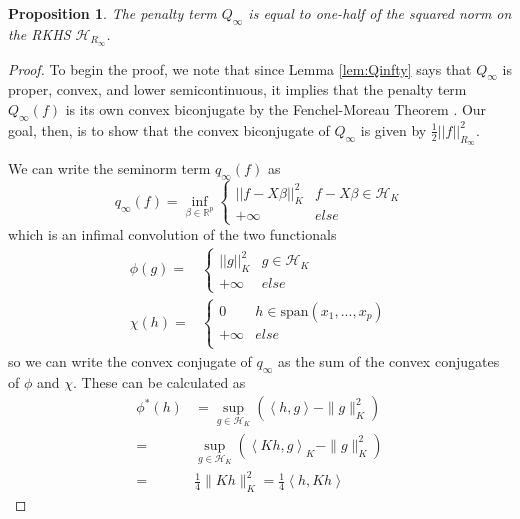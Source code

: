 \documentclass[ejsv2,preprint]{imsart}
\newtheorem{prop}{Proposition}[section]
\newcommand{\inprod}[2]{\left\langle #1,#2\right\rangle}
\newcommand{\norm}[1]{\left|\left|  #1 \right| \right|}
\newcommand{\SPAN}[1]{\text{span}\left(#1\right)}
\begin{document}
\begin{prop}
    The penalty term $Q_\infty$ is equal to one-half of the squared norm on the RKHS $\mathcal{H}_{R_\infty}$.
\end{prop}
\begin{proof}
To begin the proof, we note that since Lemma \ref{lem:Qinfty} says that $Q_\infty$ is proper, convex, and lower semicontinuous, it implies that the penalty term $Q_\infty(f)$ is its own convex biconjugate by the Fenchel-Moreau Theorem \cite{correa2023fundamentals}. Our goal, then, is to show that the convex biconjugate of $Q_\infty$ is given by $\frac{1}{2}\norm{f}^2_{R_\infty}$.

We can write the seminorm term $q_\infty(f)$ as
\begin{equation}
    q_\infty(f)=\underset{\beta\in \mathbb{R}^p}{\inf}\begin{cases}
        \norm{f-X\beta}_K^2&f-X\beta\in \mathcal{H}_K\\
        +\infty&else
    \end{cases}
\end{equation}
which is an infimal convolution of the two functionals
\begin{equation}
    \begin{split}
        \phi(g) =&\begin{cases}
        \norm{g}_K^2&g\in \mathcal{H}_K\\
        +\infty&else
    \end{cases} \\
    \chi(h) =& \begin{cases}0&h\in \SPAN{x_1,...,x_p}\\
    +\infty & else \\ \end{cases}
    \end{split}
\end{equation}
so we can write the convex conjugate of $q_\infty$ as the sum of the convex conjugates of $\phi$ and $\chi$. These can be calculated as 
\begin{equation}
    \begin{split}
        \phi^*(h) & = \underset{g\in \mathcal{H}_K}{\sup}\left( \inprod{h}{g}-\|g\|_K^2\right) \\ 
        =& \underset{g\in \mathcal{H}_K}{\sup}\left( \inprod{Kh}{g}_K-\|g\|_K^2 \right)\\
        = &\frac{1}{4}\|Kh\|_K^2= \frac{1}{4}\inprod{h}{Kh}
    \end{split}
\end{equation}

\end{proof}
\end{document}
